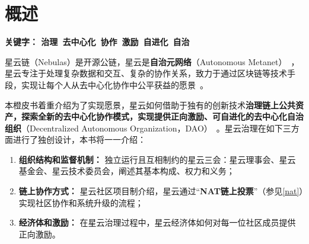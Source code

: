 \section{概述}

\textbf{关键字： 治理\ 去中心化\ 协作\ 激励\ 自进化\ 自治 }

\vspace{2em}

星云链（Nebulas）是开源公链，星云是\textbf{自治元网络}（Autonomous Metanet）~\cite{AutonomousMetanet}，星云专注于处理复杂数据和交互、复杂的协作关系，致力于通过区块链等技术手段，实现让每个人从去中心化协作中公平获益的愿景~\cite{vision}。

本橙皮书着重介绍为了实现愿景，星云如何借助于独有的创新技术\textbf{治理链上公共资产，探索全新的去中心化协作模式，实现提供正向激励、可自进化的去中心化自治组织}（Decentralized Autonomous Organization，DAO）~\cite{DAO}。星云治理在如下三方面进行了独创设计，本书将一一介绍：

\begin{enumerate}
	\item \textbf{组织结构和监督机制：}
	独立运行且互相制约的星云三会：星云理事会、星云基金会、星云技术委员会，阐述其基本构成、权力和义务；
	\item \textbf{链上协作方式：}
	星云社区项目制介绍，星云通过“\textbf{NAT链上投票}”（参见\ref{nat}）实现社区协作和系统升级的流程；
	\item \textbf{经济体和激励：}
	在星云治理过程中，星云经济体如何对每一位社区成员提供正向激励。
\end{enumerate}